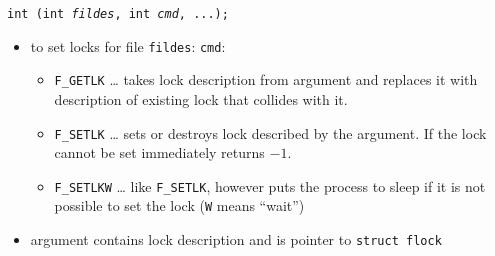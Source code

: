

\begin{slide}
\texttt{int (int \emph{fildes}, int \emph{cmd}, ...);}
\begin{itemize}
\item to set locks for file \texttt{fildes}:
\texttt{cmd}: 
    \begin{itemize}
    \item \texttt{F\_GETLK} \dots{} takes lock description from  argument
    and replaces it with description of existing lock that collides with it.
    \item \texttt{F\_SETLK} \dots{} sets or destroys lock described by the 
    argument. If the lock cannot be set immediately returns $-1$.
    \item \texttt{F\_SETLKW} \dots{} like \texttt{F\_SETLK}, however puts
    the process to sleep if it is not possible to set the lock 
    (\texttt{W} means ``wait'')
    \end{itemize}
\item {} argument contains lock description and is pointer to 
\texttt{struct flock}
\end{itemize}
\end{slide}

